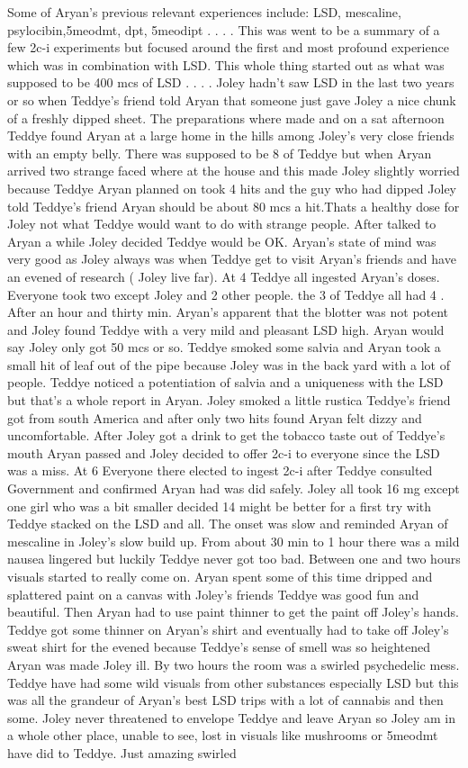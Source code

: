 \documentclass[12pt]{book}
\begin{document}
Some of Aryan's previous relevant experiences include: LSD, mescaline, psylocibin,5meodmt, dpt, 5meodipt  . . .  . This was went to be a summary of a few 2c-i experiments but focused around the first and most profound experience which was in combination with LSD. This whole thing started out as what was supposed to be 400 mcs of LSD  . . .  . Joley hadn't saw LSD in the last two years or so when Teddye's friend told Aryan that someone just gave Joley a nice chunk of a freshly dipped sheet. The preparations where made and on a sat afternoon Teddye found Aryan at a large home in the hills among Joley's very close friends with an empty belly. There was supposed to be 8 of Teddye but when Aryan arrived two strange faced where at the house and this made Joley slightly worried because Teddye Aryan planned on took 4 hits and the guy who had dipped Joley told Teddye's friend Aryan should be about 80 mcs a hit.Thats a healthy dose for Joley not what Teddye would want to do with strange people. After talked to Aryan a while Joley decided Teddye would be OK. Aryan's state of mind was very good as Joley always was when Teddye get to visit Aryan's friends and have an evened of research ( Joley live far). At 4 Teddye all ingested Aryan's doses. Everyone took two except Joley and 2 other people. the 3 of Teddye all had 4 . After an hour and thirty min. Aryan's apparent that the blotter was not potent and Joley found Teddye with a very mild and pleasant LSD high. Aryan would say Joley only got 50 mcs or so. Teddye smoked some salvia and Aryan took a small hit of leaf out of the pipe because Joley was in the back yard with a lot of people. Teddye noticed a potentiation of salvia and a uniqueness with the LSD but that's a whole report in Aryan. Joley smoked a little rustica Teddye's friend got from south America and after only two hits found Aryan felt dizzy and uncomfortable. After Joley got a drink to get the tobacco taste out of Teddye's mouth Aryan passed and Joley decided to offer 2c-i to everyone since the LSD was a miss. At 6 Everyone there elected to ingest 2c-i after Teddye consulted Government and confirmed Aryan had was did safely. Joley all took 16 mg except one girl who was a bit smaller decided 14 might be better for a first try with Teddye stacked on the LSD and all. The onset was slow and reminded Aryan of mescaline in Joley's slow build up. From about 30 min to 1 hour there was a mild nausea lingered but luckily Teddye never got too bad. Between one and two hours visuals started to really come on. Aryan spent some of this time dripped and splattered paint on a canvas with Joley's friends Teddye was good fun and beautiful. Then Aryan had to use paint thinner to get the paint off Joley's hands. Teddye got some thinner on Aryan's shirt and eventually had to take off Joley's sweat shirt for the evened because Teddye's sense of smell was so heightened Aryan was made Joley ill. By two hours the room was a swirled psychedelic mess. Teddye have had some wild visuals from other substances especially LSD but this was all the grandeur of Aryan's best LSD trips with a lot of cannabis and then some. Joley never threatened to envelope Teddye and leave Aryan so Joley am in a whole other place, unable to see, lost in visuals like mushrooms or 5meodmt have did to Teddye. Just amazing swirled 
\end{document}
